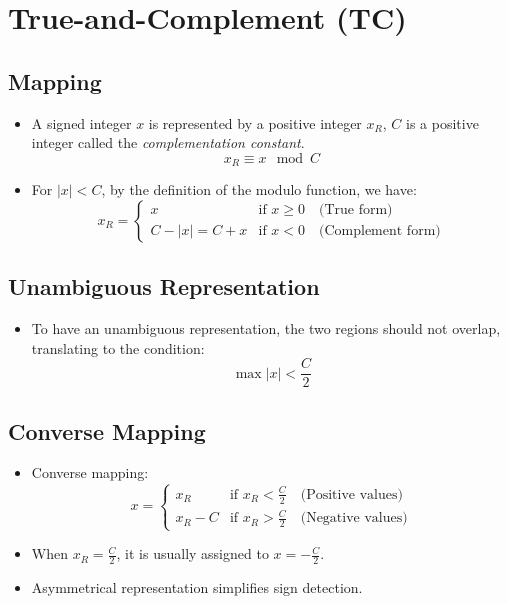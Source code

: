 \documentclass[12pt,openany, tikz,border=10pt]{book}
\begin{document}
\section{True-and-Complement (TC)}

\subsection{Mapping}
\begin{itemize}
    \item[] A signed integer \( x \) is represented by a positive integer \( x_R \), \( C \) is a positive integer called the \textit{complementation constant}.
    \[ x_R \equiv x \mod C \]
    
    \item[] For \( |x| < C \), by the definition of the modulo function, we have:
    \[
    x_R = 
    \begin{cases} 
    x & \text{if } x \geq 0 \quad \text{(True form)} \\
    C - |x| = C + x & \text{if } x < 0 \quad \text{(Complement form)}
    \end{cases}
    \]
\end{itemize}

\subsection{Unambiguous Representation}
\begin{itemize}
    \item[] To have an unambiguous representation, the two regions should not overlap, translating to the condition:
    \[ \max |x| < \frac{C}{2} \]
\end{itemize}


\subsection{Converse Mapping}
\begin{itemize}
    \item[] Converse mapping:
    \[
    x = 
    \begin{cases} 
    x_R & \text{if } x_R < \frac{C}{2} \quad \text{(Positive values)} \\
    x_R - C & \text{if } x_R > \frac{C}{2} \quad \text{(Negative values)}
    \end{cases}
    \]
    \item[] When \( x_R = \frac{C}{2} \), it is usually assigned to \( x = -\frac{C}{2} \).
    \item[] Asymmetrical representation simplifies sign detection.

\end{itemize}
\end{document}
